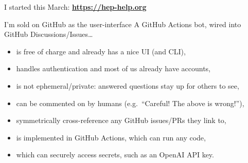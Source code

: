\documentclass[aspectratio=169]{beamer}
\begin{document}
\begin{frame}{I started this March: \textcolor{lightblue}{\bf \url{https://hep-help.org}}}
\vspace{0.25 cm}
\begin{center}
\end{center}
\end{frame}

\begin{frame}{I'm sold on GitHub as the user-interface}
\large
\vspace{0.35 cm}
A GitHub Actions bot, wired into GitHub Discussions/Issues\ldots

\vspace{0.2 cm}
\begin{itemize}\setlength{\itemsep}{0.2 cm}
\item is free of charge and already has a nice UI (and CLI),
\item handles authentication and most of us already have accounts,
\item is not ephemeral/private: answered questions stay up for others to see,
\item can be commented on by humans (e.g.\ ``Careful! The above is wrong!''),
\item symmetrically cross-reference any GitHub issues/PRs they link to,
\item is implemented in GitHub Actions, which can run any code,
\item which can securely access secrets, such as an OpenAI API key.
\end{itemize}

\vspace{0.35 cm}

\vspace{0.35 cm}

\end{frame}
\end{document}
